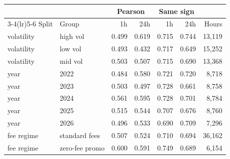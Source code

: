 \begin{tabular}{llrrrrr}
\toprule
 & & \multicolumn{2}{c}{Pearson} & \multicolumn{2}{c}{Same sign} & \\
\cmidrule(lr){3-4}\cmidrule(lr){5-6} Split & Group & 1h & 24h & 1h & 24h & Hours\\
\midrule
volatility & high vol & 0.499 & 0.619 & 0.715 & 0.744 & 13,119\\
volatility & low vol & 0.493 & 0.432 & 0.717 & 0.649 & 15,252\\
volatility & mid vol & 0.503 & 0.507 & 0.715 & 0.690 & 13,368\\
year & 2022 & 0.484 & 0.580 & 0.721 & 0.720 & 8,718\\
year & 2023 & 0.503 & 0.497 & 0.728 & 0.661 & 8,758\\
year & 2024 & 0.561 & 0.595 & 0.728 & 0.701 & 8,784\\
year & 2025 & 0.515 & 0.544 & 0.707 & 0.676 & 8,760\\
year & 2026 & 0.496 & 0.533 & 0.690 & 0.709 & 7,296\\
fee regime & standard fees & 0.507 & 0.524 & 0.710 & 0.694 & 36,162\\
fee regime & zero-fee promo & 0.600 & 0.591 & 0.749 & 0.689 & 6,154\\
\bottomrule
\end{tabular}
